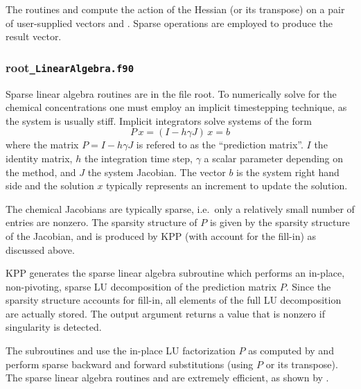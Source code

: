 \documentclass[twoside]{article}
\newcommand{\kpproot}{{\sc root}}
\begin{document}
The routines  and  compute the action of
the Hessian (or its transpose) on a pair of user-supplied vectors
 and . Sparse operations are employed to produce the
result vector.

\subsubsection{\kpproot{\tt\_LinearAlgebra.f90}}
\label{sec:output-la}

Sparse linear algebra routines are in the file
\kpproot{}. To numerically solve for the chemical
concentrations one must employ an implicit timestepping technique, as
the system is usually stiff. Implicit integrators solve systems of the
form
%
\begin{equation}
P\, x = (I - h \gamma J)\, x = b
\end{equation}
%
where the matrix $P=I - h \gamma J$ is refered to as the ``prediction
matrix''. $I$ the identity matrix, $h$ the integration time step,
$\gamma$ a scalar parameter depending on the method, and $J$ the system
Jacobian. The vector $b$ is the system right hand side and the solution
$x$ typically represents an increment to update the solution.

The chemical Jacobians are typically sparse, i.e.\ only a relatively
small number of entries are nonzero. The sparsity structure of $P$ is
given by the sparsity structure of the Jacobian, and is produced by KPP
(with account for the fill-in) as discussed above.

KPP generates the sparse linear algebra subroutine 
which performs an in-place, non-pivoting, sparse LU decomposition of the
prediction matrix $P$. Since the sparsity structure accounts for
fill-in, all elements of the full LU decomposition are actually stored.
The output argument  returns a value that is nonzero if
singularity is detected.

The subroutines  and  use the in-place
LU factorization $P$ as computed by  and perform sparse
backward and forward substitutions (using $P$ or its transpose). The
sparse linear algebra routines  and  are
extremely efficient, as shown by \citep{IMPLEMENTATION}.

\end{document}
